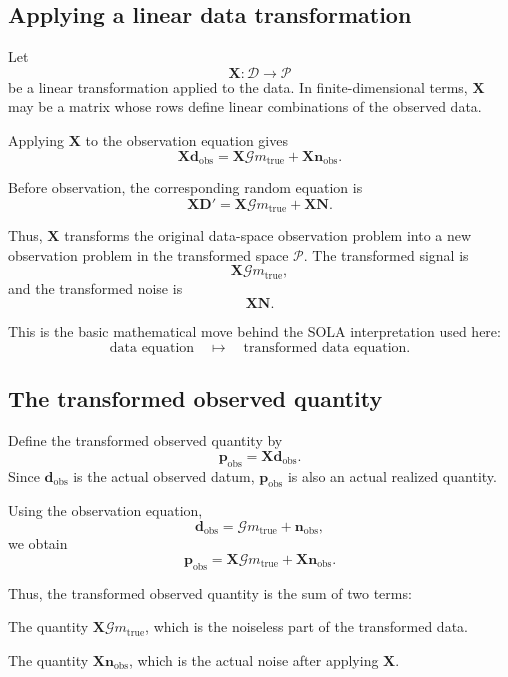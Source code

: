 \documentclass[11pt]{article}
\newcommand{\Dspace}{\mathcal D}
\newcommand{\Pspace}{\mathcal P}
\newcommand{\Dobsrand}{\mathbf D'}
\newcommand{\Nrand}{\mathbf N}
\newcommand{\dobs}{\mathbf d_{\mathrm{obs}}}
\newcommand{\nobs}{\mathbf n_{\mathrm{obs}}}
\newcommand{\pobs}{\mathbf p_{\mathrm{obs}}}
\newcommand{\G}{\mathcal G}
\newcommand{\X}{\mathbf X}
\begin{document}
\subsection{Applying a linear data transformation}

Let
\[
    \X:\Dspace\to\Pspace
\]
be a linear transformation applied to the data. In finite-dimensional terms, \(\X\) may be a matrix whose rows define linear combinations of the observed data.

Applying \(\X\) to the observation equation gives
\[
    \X\dobs
    =
    \X\G m_{\mathrm{true}}
    +
    \X\nobs.
\]

Before observation, the corresponding random equation is
\[
    \X\Dobsrand
    =
    \X\G m_{\mathrm{true}}
    +
    \X\Nrand.
\]

Thus, \(\X\) transforms the original data-space observation problem into a new observation problem in the transformed space \(\Pspace\). The transformed signal is
\[
    \X\G m_{\mathrm{true}},
\]
and the transformed noise is
\[
    \X\Nrand.
\]

This is the basic mathematical move behind the SOLA interpretation used here:
\[
    \text{data equation}
    \quad
    \longmapsto
    \quad
    \text{transformed data equation}.
\]

\subsection{The transformed observed quantity}

Define the transformed observed quantity by
\[
    \pobs=\X\dobs.
\]
Since \(\dobs\) is the actual observed datum, \(\pobs\) is also an actual realized quantity.

Using the observation equation,
\[
    \dobs=\G m_{\mathrm{true}}+\nobs,
\]
we obtain
\[
    \pobs
    =
    \X\G m_{\mathrm{true}}
    +
    \X\nobs.
\]

Thus, the transformed observed quantity is the sum of two terms:
\begin{description}[leftmargin=3.2cm,style=nextline]
    \item[Transformed true signal.]
    The quantity \(\X\G m_{\mathrm{true}}\), which is the noiseless part of the transformed data.

    \item[Transformed realized noise.]
    The quantity \(\X\nobs\), which is the actual noise after applying \(\X\).
\end{description}
\end{document}
